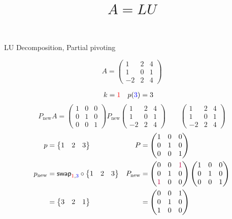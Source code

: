 \documentclass[pdf]{beamer}
\title{$A=LU$}
\subtitle{}
\author{}
\begin{document}
\begin{frame}{}
\begin{center}LU Decomposition, Partial pivoting\end{center} $$A = \begin{pmatrix}1&2&4\\1&0&1\\-2&2&4\end{pmatrix}$$\end{frame}
\begin{frame}{}\begin{align*} k &= {\color{red}1} & p({\color{blue}3}) &= 3\end{align*} $$P_{\text{new}}A=\begin{pmatrix}1&0&0\\0&1&0\\0&0&1\end{pmatrix} P_{\text{new}} \begin{pmatrix}1&2&4\\1&0&1\\\boxed{-2}&2&4\end{pmatrix} \quad\quad \begin{pmatrix}1&2&4\\1&0&1\\-2&2&4\end{pmatrix}$$ \begin{align*} p&= \begin{Bmatrix}1&2&3\end{Bmatrix} & P&= \begin{pmatrix}1&0&0\\0&1&0\\0&0&1\end{pmatrix}\\ p_{\text{new}} &= \mathsf{swap}_{{\color{red}1},{\color{blue}3}} \circ \begin{Bmatrix}1&2&3\end{Bmatrix} & P_{\text{new}} &= \begin{pmatrix}0&0&{\color{purple}1}\\0&1&0\\{\color{purple}1}&0&0\end{pmatrix} \begin{pmatrix}1&0&0\\0&1&0\\0&0&1\end{pmatrix}\\ &=\begin{Bmatrix}3&2&1\end{Bmatrix} &&=\begin{pmatrix}0&0&1\\0&1&0\\1&0&0\end{pmatrix}\end{align*}\end{frame}
\end{document}
